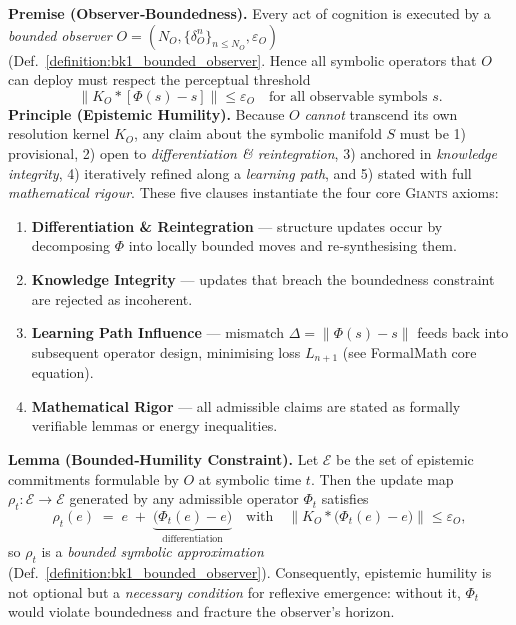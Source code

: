 \begin{scholium}
\label{scholium:bk1_epistemic_humility}
\textbf{Premise (Observer‑Boundedness).}  
Every act of cognition is executed by a \emph{bounded observer}\/ $O=(N_O,\{\delta^n_O\}_{n\le N_O},\varepsilon_O)$ (Def.~\ref{definition:bk1_bounded_observer}.  
Hence all symbolic operators that $O$ can deploy must respect the perceptual threshold
\[
  \|K_O\ast[\Phi(s)-s]\|\le\varepsilon_O
  \quad\text{for all observable symbols }s.
\]
\medskip
\textbf{Principle (Epistemic Humility).}  
Because $O$ \emph{cannot} transcend its own resolution kernel $K_O$, any claim about the symbolic manifold $S$ must be  
1) provisional,  
2) open to \emph{differentiation \& reintegration},  
3) anchored in \emph{knowledge integrity},  
4) iteratively refined along a \emph{learning path}, and  
5) stated with full \emph{mathematical rigour}.  
These five clauses instantiate the four core \textsc{Giants} axioms:  
\begin{enumerate}[label=\arabic*.]
  \item \textbf{Differentiation \& Reintegration} — structure updates occur by decomposing $\Phi$ into locally bounded moves and re‑synthesising them.  
  \item \textbf{Knowledge Integrity} — updates that breach the boundedness constraint are rejected as incoherent.  
  \item \textbf{Learning Path Influence} — mismatch $\Delta=\|\Phi(s)-s\|$ feeds back into subsequent operator design, minimising loss $L_{n+1}$ (see FormalMath core equation).  
  \item \textbf{Mathematical Rigor} — all admissible claims are stated as formally verifiable lemmas or energy inequalities.  
\end{enumerate}
\medskip
\textbf{Lemma (Bounded‑Humility Constraint).}  
Let $\mathcal{E}$ be the set of epistemic commitments formulable by $O$ at symbolic time $t$.  
Then the update map $\rho_t:\mathcal{E}\to\mathcal{E}$ generated by any admissible operator $\Phi_t$ satisfies
\[
  \rho_t(e)\;=\;e\;+\;\underbrace{\bigl(\Phi_t(e)-e\bigr)}_{\text{differentiation}}
  \quad\text{with}\quad
  \|K_O\ast\bigl(\Phi_t(e)-e\bigr)\|\le\varepsilon_O,
\]
so $\rho_t$ is a \emph{bounded symbolic approximation} (Def.~\ref{definition:bk1_bounded_observer}).  
Consequently, epistemic humility is not optional but a \emph{necessary condition} for reflexive emergence: without it, $\Phi_t$ would violate boundedness and fracture the observer’s horizon.
\end{scholium}
